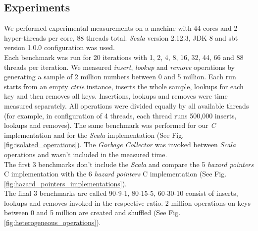 \documentclass[conference]{IEEEtran}
\begin{document}
\subsection{Experiments}
	We performed experimental measurements on a machine with 44 cores and 2 hyper-threads per core, 88 threads total. \textit{Scala} version 2.12.3, JDK 8 and sbt version 1.0.0 configuration was used. \\
	Each benchmark was run for 20 iterations with 1, 2, 4, 8, 16, 32, 44, 66 and 88 threads per iteration. We measured \textit{insert}, \textit{lookup} and \textit{remove} operations by generating a sample of 2 million numbers between 0 and 5 million. Each run starts from an empty \textit{ctrie} instance, inserts the whole sample, lookups for each key and then removes all keys. Insertions, lookups and removes were time measured separately. All operations were divided equally by all available threads (for example, in configuration of 4 threads, each thread runs 500,000 inserts, lookups and removes). The same benchmark was performed for our \textit{C} implementation and for the \textit{Scala} implementation (See Fig. \ref{fig:isolated_operations}). The \textit{Garbage Collector} was invoked between \textit{Scala} operations and wasn't included in the measured time. \\
	The first 3 benchmarks don't include the \textit{Scala} and compare the 5 \textit{hazard pointers} C implementation with the 6 \textit{hazard pointers} C implementation (See Fig. \ref{fig:hazard_pointers_implementations}). \\
	The final 3 benchmarks are called 90-9-1, 80-15-5, 60-30-10 consist of inserts, lookups and removes invoked in the respective ratio. 2 million operations on keys between 0 and 5 million are created and shuffled (See Fig. \ref{fig:heterogeneous_operations}).
\end{document}
